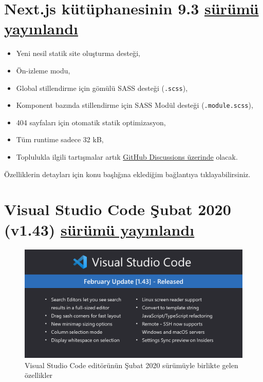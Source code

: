 \documentclass[11pt]{article}
\begin{document}
\section{Next.js kütüphanesinin 9.3 \href{https://nextjs.org/blog/next-9-3}{sürümü yayınlandı}}
\label{sec:org7c47022}
\begin{itemize}
\item Yeni nesil statik site oluşturma desteği,
\item Ön-izleme modu,
\item Global stillendirme için gömülü SASS desteği (\texttt{.scss}),
\item Komponent bazında stillendirme için SASS Modül desteği (\texttt{.module.scss}),
\item 404 sayfaları için otomatik statik optimizasyon,
\item Tüm runtime sadece 32 kB,
\item Toplulukla ilgili tartışmalar artık \href{https://github.com/zeit/next.js/discussions}{GitHub Discussions üzerinde} olacak.
\end{itemize}

Özelliklerin detayları için konu başlığına eklediğim bağlantıya
tıklayabilirsiniz.
\newpage
\section{Visual Studio Code Şubat 2020 (v1.43) \href{https://code.visualstudio.com/updates/v1\_43}{sürümü yayınlandı}}
\label{sec:org91b5c68}
\begin{figure}[htbp]
\centering
\includegraphics[width=.9\linewidth]{gorseller/vscode-1-43.png}
\caption{Visual Studio Code editörünün Şubat 2020 sürümüyle birlikte gelen özellikler}
\end{figure}
\end{document}
